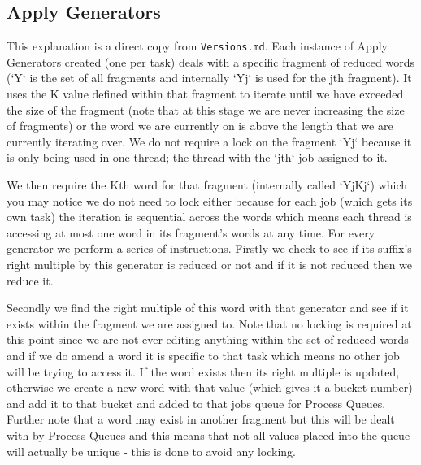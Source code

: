 \documentclass{report}
\begin{document}
\subsection*{Apply Generators}
This explanation is a direct copy from \texttt{Versions.md}. 
\newline
Each instance of Apply Generators created (one per task) deals with a specific fragment of reduced words (`Y` is the set of all fragments and internally `Yj` is used for the jth fragment). It uses the K value defined within that fragment to iterate until we have exceeded the size of the fragment (note that at this stage we are never increasing the size of fragments) or the word we are currently on is above the length that we are currently iterating over. We do not require a lock on the fragment `Yj` because it is only being used in one thread; the thread with the `jth` job assigned to it.

We then require the Kth word for that fragment (internally called `YjKj`) which you may notice we do not need to lock either because for each job (which gets its own task) the iteration is sequential across the words which means each thread is accessing at most one word in its fragment's words at any time. For every generator we perform a series of instructions. Firstly we check to see if its suffix's right multiple by this generator is reduced or not and if it is not reduced then we reduce it.

Secondly we find the right multiple of this word with that generator and see if it exists within the fragment we are assigned to. Note that no locking is required at this point since we are not ever editing anything within the set of reduced words and if we do amend a word it is specific to that task which means no other job will be trying to access it.
If the word exists then its right multiple is updated, otherwise we create a new word with that value (which gives it a bucket number) and add it to that bucket and added to that jobs queue for Process Queues.
Further note that a word may exist in another fragment but this will be dealt with by Process Queues and this means that not all values placed into the queue will actually be unique - this is done to avoid any locking.
\end{document}
